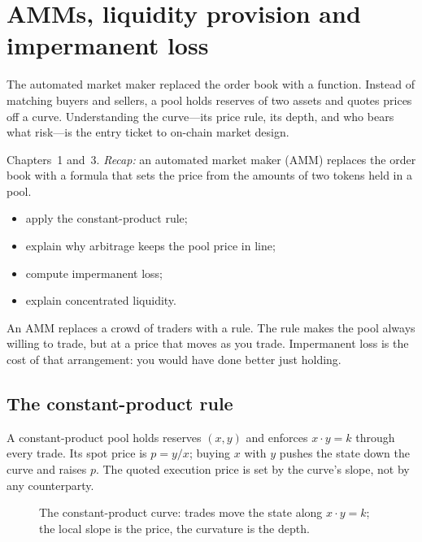 \chapter{AMMs, liquidity provision and impermanent loss}\label{ch:amm}

\noindent The automated market maker replaced the order book with a function. Instead of
matching buyers and sellers, a pool holds reserves of two assets and quotes prices off a
curve. Understanding the curve---its price rule, its depth, and who bears what risk---is the
entry ticket to on-chain market design.

\begin{rulebox}
Chapters~1 and~3. \emph{Recap:} an automated market maker (AMM) replaces the order book with a formula that sets the price from the amounts of two tokens held in a pool.
\end{rulebox}
\begin{wins}
\begin{itemize}
\item apply the constant-product rule;
\item explain why arbitrage keeps the pool price in line;
\item compute impermanent loss;
\item explain concentrated liquidity.
\end{itemize}
\end{wins}
\begin{principle}
An AMM replaces a crowd of traders with a rule. The rule makes the pool always willing to trade, but at a price that moves as you trade. Impermanent loss is the cost of that arrangement: you would have done better just holding.
\end{principle}

\section{The constant-product rule}\label{sec:cpmm}

A constant-product pool holds reserves $(x,y)$ and enforces $x\cdot y=k$ through every trade.
Its spot price is $p=y/x$; buying $x$ with $y$ pushes the state down the curve and raises $p$.
The quoted execution price is set by the curve's slope, not by any counterparty.

\begin{figure}[htbp]\centering

\caption{The constant-product curve: trades move the state along $x\cdot y=k$; the local
slope is the price, the curvature is the depth.}
\label{fig:cpmm}
\end{figure}

